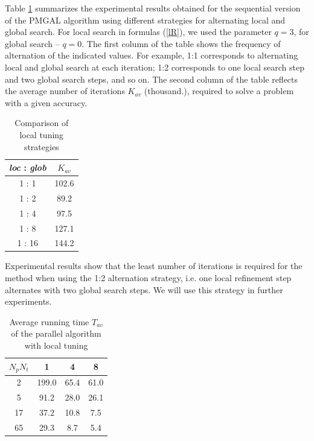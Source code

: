 \documentclass[
11pt,%
tightenlines,%
twoside,%
onecolumn,%
nofloats,%
nobibnotes,%
nofootinbib,%
superscriptaddress,%
noshowpacs,%
centertags]%
{revtex4}
\begin{document}
Table \ref{tab:2} summarizes the experimental results obtained for the sequential version of the PMGAL algorithm using different strategies for alternating local and global search. For local search in formulas  (\ref{lR}), we used the parameter $q=3$, for global search -- $q=0$. The first column of the table shows the frequency of alternation of the indicated values. For example, 1:1 corresponds to alternating local and global search at each iteration; 1:2 corresponds to one local search step and two global search steps, and so on. The second column of the table reflects the average number of iterations  $K_{av}$ (thousand.), required to solve a problem with a given accuracy.

\begin{table}
	\caption{Comparison of local tuning strategies}
	\label{tab:2}
	\center
	\begin{tabular}{|c|c|}
		\hline		
		\textit{loc} : \textit{glob} & $K_{av}$   \\
		\hline 
		1 : 1 & 102.6\\
		1 : 2 & 89.2\\
		1 : 4 & 97.5\\
		1 : 8 & 127.1\\
		1 : 16 & 144.2\\
		\hline
	\end{tabular}
\end{table}	


Experimental results show that the least number of iterations is required for the method when using the 1:2 alternation strategy, i.e. one local refinement step alternates with two global search steps. We will use this strategy in further experiments.

\begin{table}
	\caption{Average running time $T_{av}$ of the parallel algorithm with local tuning}
	\label{tab:3}
	\center
	\begin{tabular}{|c|c|c|c|}
		\hline	
	\diaghead{\theadfont Diag Column} { $N_{p}$}{$N_{t}$} & 1 & 4 & 8\\
	
		\hline		
		2  & 199.0 & 65.4 & 61.0  \\
		5  & 91.2 & 28.0 &  26.1 \\
		17  & 37.2 & 10.8 & 7.5 \\
		65  & 29.3 & 8.7 & 5.4 \\
		\hline
	\end{tabular}
\end{table}	
\end{document}
